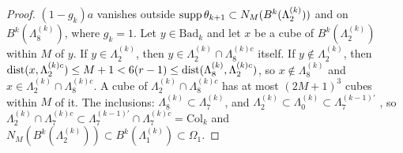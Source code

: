 \begin{proof}
$(1-g_k)a$ vanishes outside $\operatorname{supp}\theta_{k+1}\subset N_M(B^k(\Lambda^{(k)}_2))$ and on $B^k(\Lambda^{(k)}_8)$, where $g_k=1$. Let $y\in\mathrm{Bad}_k$ and let $x$ be a cube of $B^k(\Lambda^{(k)}_2)$ within $M$ of $y$. If $y\in\Lambda^{(k)}_2$, then $y\in\Lambda^{(k)}_2\cap\Lambda^{(k)c}_8$ itself. If $y\notin\Lambda^{(k)}_2$, then $\operatorname{dist}(x,\Lambda^{(k)c}_2)\le M+1<6(r-1)\le\operatorname{dist}(\Lambda^{(k)}_8,\Lambda^{(k)c}_2)$, so $x\notin\Lambda^{(k)}_8$ and $x\in\Lambda^{(k)}_2\cap\Lambda^{(k)c}_8$. A cube of $\Lambda^{(k)}_2\cap\Lambda^{(k)c}_8$ has at most $(2M+1)^3$ cubes within $M$ of it. The inclusions: $\Lambda^{(k)}_8\subset\Lambda^{(k)}_7$, and $\Lambda^{(k)}_2\subset\Lambda^{(k)}_0\subset\Lambda^{(k-1)'}_7$ \cite[pp.~566, 570]{Ba2}, so $\Lambda^{(k)}_2\cap\Lambda^{(k)c}_7\subset\Lambda^{(k-1)'}_7\cap\Lambda^{(k)c}_7=\mathrm{Col}_k$ and $N_M(B^k(\Lambda^{(k)}_2))\subset B^k(\Lambda^{(k)}_1)\subset\Omega_1$.
\end{proof}
